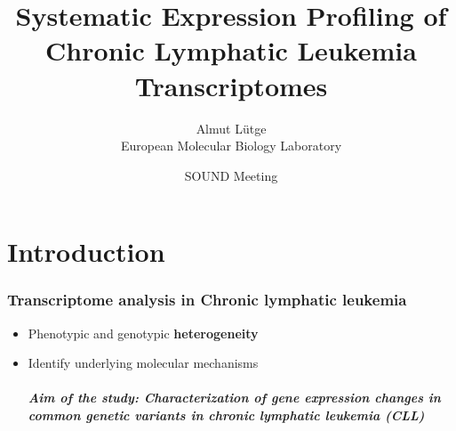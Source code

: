 \documentclass[xcolor=dvipsnames,t,10pt]{beamer}
\title[Expression profiling CLL]{Systematic Expression Profiling of Chronic Lymphatic Leukemia Transcriptomes}
\author[Almut Lütge - European Molecular Biology Laboratory]{Almut Lütge\\European Molecular Biology Laboratory}
\date{SOUND Meeting \\ \bigskip {\monthyeardate{\today}}}
\begin{document}
\begin{frame}
  \titlepage
\end{frame}

%
%
%
%
\section{Introduction}
%
\begin{frame}[c]
	\frametitle{Transcriptome analysis in Chronic lymphatic leukemia}
	\begin{itemize}
	\item Phenotypic and genotypic \textbf{heterogeneity} 
	\item Identify underlying molecular mechanisms
	\\~\\
	\textbf{\textit{Aim of the study: Characterization of gene expression changes in common genetic variants in chronic lymphatic leukemia  (CLL)}}
	\end{itemize}
\end{frame}
%
%
\end{document}
